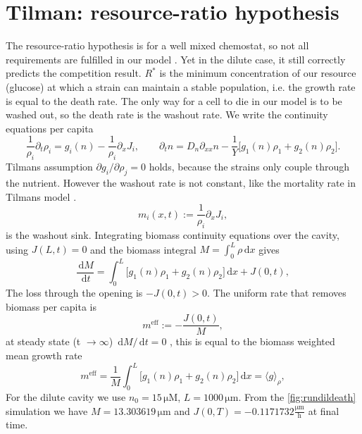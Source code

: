 \documentclass[11pt,a4paper]{report}
\newcommand{\dd}{\,\mathrm d}
\newcommand{\pd}{\partial}
\begin{document}
\section{Tilman: resource-ratio hypothesis}
\label{sec:rstar}
The resource-ratio hypothesis is for a well mixed chemostat, so not all requirements are fulfilled in our model \cite{rstar}. Yet in the dilute case, it still correctly predicts the competition result. $R^*$ is the minimum concentration of our resource (glucose) at which a strain can maintain a stable population, i.e. the growth rate is equal to the death rate. The only way for a cell to die in our model is to be washed out, so the death rate is the washout rate. We write the continuity equations per capita
\begin{equation}
	\frac{1}{\rho_i}\pd_t\rho_i
	=g_i(n)
	-\frac{1}{\rho_i}\pd_xJ_i,
	\qquad
	\pd_tn
	=D_n\pd_{xx}n
	-\frac1Y \bigl[g_1(n)\rho_1+g_2(n)\rho_2\bigr].
	\label{eq:tilman_in_our_variables}
\end{equation}
Tilmans assumption $\pd g_i/\pd \rho_j=0$ holds, because the strains only couple through
the nutrient. However the washout rate is not constant, like the mortality rate in Tilmans model \cite{rstar}.
\begin{equation}
	m_i(x,t):=\frac{1}{\rho_i}\pd_xJ_i,
	\label{eq:local_loss_rate}
\end{equation}
is the washout sink. Integrating biomass continuity equations over the cavity, using $J(L,t)=0$ and the biomass integral $M=\int_0^L\rho\dd x$ gives
\begin{equation}
	\frac{\dd M}{\dd t}=\int_0^L\bigl[g_1(n)\rho_1+g_2(n)\rho_2\bigr]\dd x+J(0,t),
	\label{eq:mass_budget}
\end{equation}
The loss through the opening is $-J(0,t)>0$. The uniform rate that
removes biomass per capita is 
\begin{equation}
	m^{\mathrm{eff}}:=-\frac{J(0,t)}{M},
	\label{eq:m_eff_flux}
	\end{equation}
at steady state (t $\rightarrow \infty$) $\dd M/\dd t=0$ , this is equal to the biomass weighted mean growth rate
\begin{equation}
	m^{\mathrm{eff}}
	=\frac{1}{M}\int_0^L\bigl[g_1(n)\rho_1+g_2(n)\rho_2\bigr]\dd x
	=\bigl\langle g\bigr\rangle_{\rho},
	\label{eq:m_eff_growth}
	\end{equation}
For the dilute cavity we use $n_0=15\,\mathrm{\mu M}$, $L=1000\,\mathrm{\mu m}$. From the \ref{fig:rundildeath} simulation we have $M=13.303619\,\mathrm{\mu m}$ and $J(0,T)=-0.1171732\mathrm{\frac{\mu m}{h}}$ at final time.
\end{document}
